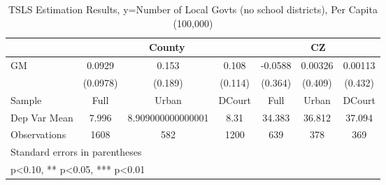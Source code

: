 \begin{table}[htbp]\centering
\def\sym#1{\ifmmode^{#1}\else\(^{#1}\)\fi}
\caption{TSLS Estimation Results, y=Number of Local Govts (no school districts), Per Capita (100,000)}
\begin{tabular}{l*{6}{c}}
\toprule
                &\multicolumn{3}{c}{County}            &\multicolumn{3}{c}{CZ}                \\\cmidrule(lr){2-4}\cmidrule(lr){5-7}
\midrule
GM              &   0.0929   &    0.153   &    0.108   &  -0.0588   &  0.00326   &  0.00113   \\
                & (0.0978)   &  (0.189)   &  (0.114)   &  (0.364)   &  (0.409)   &  (0.432)   \\
\midrule
Sample          &     Full   &    Urban   &   DCourt   &     Full   &    Urban   &   DCourt   \\
Dep Var Mean    &    7.996   &8.909000000000001   &     8.31   &   34.383   &   36.812   &   37.094   \\
Observations    &     1608   &      582   &     1200   &      639   &      378   &      369   \\
\bottomrule
\multicolumn{7}{l}{\footnotesize Standard errors in parentheses}\\
\multicolumn{7}{l}{\footnotesize * p<0.10, ** p<0.05, *** p<0.01}\\
\end{tabular}
\end{table}
